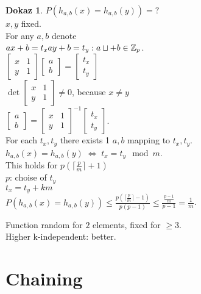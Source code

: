 \documentclass[a4paper, 12pt]{book}
\theoremstyle{definition}
\newtheorem{pro}[counter]{Dokaz}
\theoremstyle{remark}
\newcommand{\Z}{\mathbb{Z}}
\begin{document}
\begin{pro}
  $P(h_{a,b}(x) = h_{a,b}(y)) = ?$ \\
  $x, y$ fixed. \\
  For any $a, b$ denote \\
  $ax + b = t_x \\
  ay + b = t_y: \\
  a \sqcup + b \in \Z_p$. \\
  $\begin{bmatrix}x & 1 \\ y & 1\end{bmatrix} \begin{bmatrix}a \\b\end{bmatrix} =
  \begin{bmatrix}t_x \\ t_y\end{bmatrix}$ \\
  $\det \begin{bmatrix}x & 1 \\ y & 1\end{bmatrix} \neq 0$, because $x \neq y$ \\
  $\begin{bmatrix}a \\b\end{bmatrix} = \begin{bmatrix}x & 1 \\ y & 1\end{bmatrix}^{-1}
  \begin{bmatrix}t_x \\ t_y\end{bmatrix}$. \\
  For each $t_x, t_y$ there exists 1 $a, b$ mapping to $t_x, t_y$. \\
  $h_{a,b}(x) = h_{a,b}(y) \; \iff \; t_x = t_y \mod m$. \\
  This holds for $p\left(\lceil\frac{p}{m}\rceil + 1\right)$ \\
  $p$: choise of $t_y$ \\
  $t_x = t_y + km$ \\
  $P\left(h_{a,b}(x) = h_{a,b}(y)\right) \leq \frac{p\left(\lceil\frac{p}{m}\rceil-1\right)}{p(p-1)}
  \leq \frac{\frac{p-1}{m}}{p-1} = \frac{1}{m}$.
\end{pro}
Function random for $2$ elements, fixed for $\geq 3$. \\
Higher k-independent: better.

\section{Chaining}
\end{document}
